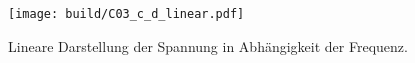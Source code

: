 



\begin{figure}[H]
    \centering
    \texttt{[image: build/C03\_c\_d\_linear.pdf]}
    \caption{Lineare Darstellung der Spannung in Abhängigkeit der Frequenz.}
    \label{fig:plot_spannung_linear}
\end{figure}


